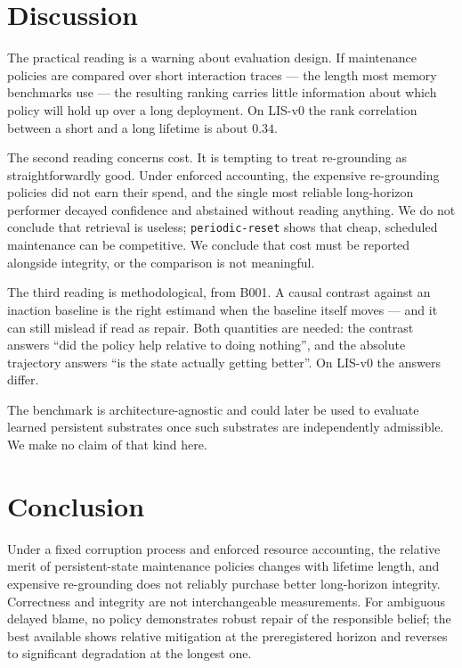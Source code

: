 \documentclass[11pt]{article}
\newcommand{\code}[1]{\texttt{\small #1}}
\begin{document}
\section{Discussion}
\label{sec:discussion}

The practical reading is a warning about evaluation design. If maintenance
policies are compared over short interaction traces --- the length most memory
benchmarks use --- the resulting ranking carries little information about which
policy will hold up over a long deployment. On LIS-v0 the rank correlation
between a short and a long lifetime is about $0.34$.

The second reading concerns cost. It is tempting to treat re-grounding as
straightforwardly good. Under enforced accounting, the expensive re-grounding
policies did not earn their spend, and the single most reliable long-horizon
performer decayed confidence and abstained without reading anything. We do not
conclude that retrieval is useless; \code{periodic-reset} shows that cheap,
scheduled maintenance can be competitive. We conclude that cost must be reported
alongside integrity, or the comparison is not meaningful.

The third reading is methodological, from B001. A causal contrast against an
inaction baseline is the right estimand when the baseline itself moves --- and it
can still mislead if read as repair. Both quantities are needed: the contrast
answers ``did the policy help relative to doing nothing'', and the absolute
trajectory answers ``is the state actually getting better''. On LIS-v0 the
answers differ.

The benchmark is architecture-agnostic and could later be used to evaluate
learned persistent substrates once such substrates are independently admissible.
We make no claim of that kind here.

\section{Conclusion}
\label{sec:conclusion}

Under a fixed corruption process and enforced resource accounting, the relative
merit of persistent-state maintenance policies changes with lifetime length, and
expensive re-grounding does not reliably purchase better long-horizon integrity.
Correctness and integrity are not interchangeable measurements. For ambiguous
delayed blame, no policy demonstrates robust repair of the responsible belief;
the best available shows relative mitigation at the preregistered horizon and
reverses to significant degradation at the longest one.
\end{document}
